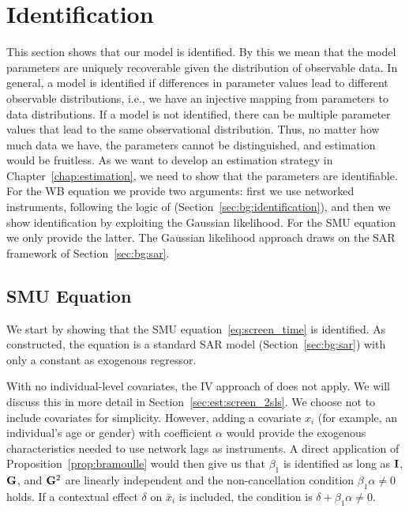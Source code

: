 \section{Identification}
\label{sec:model:identification}
This section shows that our model is identified. By this we mean that the model parameters are uniquely recoverable given the distribution of observable data. In general, a model is identified if differences in parameter values lead to different observable distributions, i.e., we have an injective mapping from parameters to data distributions. If a model is not identified, there can be multiple parameter values that lead to the same observational distribution. Thus, no matter how much data we have, the parameters cannot be distinguished, and estimation would be fruitless. As we want to develop an estimation strategy in Chapter~\ref{chap:estimation}, we need to show that the parameters are identifiable. For the WB equation we provide two arguments: first we use networked instruments, following the logic of \textcite{Bramoulle2009} (Section~\ref{sec:bg:identification}), and then we show identification by exploiting the Gaussian likelihood. For the SMU equation we only provide the latter. The Gaussian likelihood approach draws on the SAR framework of Section~\ref{sec:bg:sar}.

\subsection{SMU Equation}

We start by showing that the SMU equation~\eqref{eq:screen_time} is identified. As constructed, the equation is a standard SAR model (Section~\ref{sec:bg:sar}) with only a constant as exogenous regressor.

With no individual-level covariates, the IV approach of \textcite{Bramoulle2009} does not apply. We will discuss this in more detail in Section~\ref{sec:est:screen_2sls}. We choose not to include covariates for simplicity. However, adding a covariate $x_i$ (for example, an individual's age or gender) with coefficient $\alpha$ would provide the exogenous characteristics needed to use network lags as instruments. A direct application of Proposition~\ref{prop:bramoulle} would then give us that $\beta_1$ is identified as long as $\mathbf{I}$, $\mathbf{G}$, and $\mathbf{G}^2$ are linearly independent and the non-cancellation condition $\beta_1\alpha \neq 0$ holds. If a contextual effect $\delta$ on $\bar{x}_i$ is included, the condition is $\delta + \beta_1\alpha \neq 0$.

